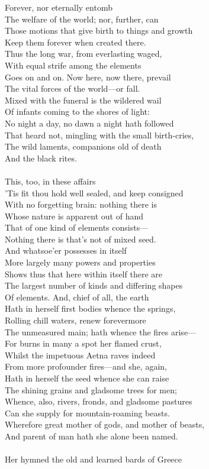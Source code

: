 Forever, nor eternally entomb\\
The welfare of the world; nor, further, can\\
Those motions that give birth to things and growth\\
Keep them forever when created there.\\
Thus the long war, from everlasting waged,\\
With equal strife among the elements\\
Goes on and on. Now here, now there, prevail\\
The vital forces of the world—or fall.\\
Mixed with the funeral is the wildered wail\\
Of infants coming to the shores of light:\\
No night a day, no dawn a night hath followed\\
That heard not, mingling with the small birth-cries,\\
The wild laments, companions old of death\\
And the black rites.\\
\\
This, too, in these affairs\\
'Tis fit thou hold well sealed, and keep consigned\\
With no forgetting brain: nothing there is\\
Whose nature is apparent out of hand\\
That of one kind of elements consists—\\
Nothing there is that's not of mixed seed.\\
And whatsoe'er possesses in itself\\
More largely many powers and properties\\
Shows thus that here within itself there are\\
The largest number of kinds and differing shapes\\
Of elements. And, chief of all, the earth\\
Hath in herself first bodies whence the springs,\\
Rolling chill waters, renew forevermore\\
The unmeasured main; hath whence the fires arise—\\
For burns in many a spot her flamed crust,\\
Whilst the impetuous Aetna raves indeed\\
From more profounder fires—and she, again,\\
Hath in herself the seed whence she can raise\\
The shining grains and gladsome trees for men;\\
Whence, also, rivers, fronds, and gladsome pastures\\
Can she supply for mountain-roaming beasts.\\
Wherefore great mother of gods, and mother of beasts,\\
And parent of man hath she alone been named.\\
\\
Her hymned the old and learned bards of Greece

